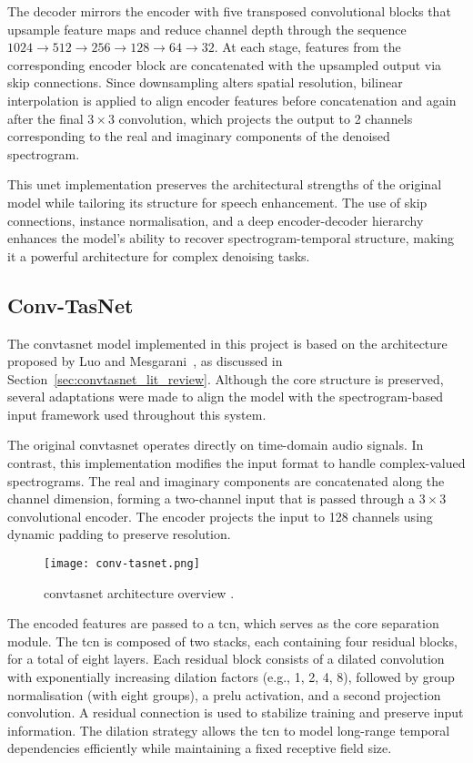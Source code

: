 The decoder mirrors the encoder with five transposed convolutional blocks that upsample feature maps and reduce channel depth through the sequence \(1024 \rightarrow 512 \rightarrow 256 \rightarrow 128 \rightarrow 64 \rightarrow 32\). At each stage, features from the corresponding encoder block are concatenated with the upsampled output via skip connections. Since downsampling alters spatial resolution, bilinear interpolation is applied to align encoder features before concatenation and again after the final \(3 \times 3\) convolution, which projects the output to 2 channels corresponding to the real and imaginary components of the denoised spectrogram.

This \gls{unet} implementation preserves the architectural strengths of the original model while tailoring its structure for speech enhancement. The use of skip connections, instance normalisation, and a deep encoder-decoder hierarchy enhances the model’s ability to recover spectrogram-temporal structure, making it a powerful architecture for complex denoising tasks.

\subsection{Conv-TasNet}
\label{sec:convtasnet}

The \gls{convtasnet} model implemented in this project is based on the architecture proposed by Luo and Mesgarani~\cite{luo2019conv}, as discussed in Section~\ref{sec:convtasnet_lit_review}. Although the core structure is preserved, several adaptations were made to align the model with the spectrogram-based input framework used throughout this system.

The original \gls{convtasnet} operates directly on time-domain audio signals. In contrast, this implementation modifies the input format to handle complex-valued spectrograms. The real and imaginary components are concatenated along the channel dimension, forming a two-channel input that is passed through a \(3 \times 3\) convolutional encoder. The encoder projects the input to 128 channels using dynamic padding to preserve resolution.

\begin{figure}[h]
    \centering
    \texttt{[image: conv-tasnet.png]}
    \caption{\label{fig:convtasnet}\gls{convtasnet} architecture overview \cite{luo2019conv}.}
\end{figure}

The encoded features are passed to a \gls{tcn}, which serves as the core separation module. The \gls{tcn} is composed of two stacks, each containing four residual blocks, for a total of eight layers. Each residual block consists of a dilated convolution with exponentially increasing dilation factors (e.g., 1, 2, 4, 8), followed by group normalisation (with eight groups), a \gls{prelu} activation, and a second projection convolution. A residual connection is used to stabilize training and preserve input information. The dilation strategy allows the \gls{tcn} to model long-range temporal dependencies efficiently while maintaining a fixed receptive field size.


